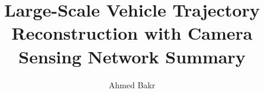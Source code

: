 \documentclass[conference]{IEEEtran}
\title{Large-Scale Vehicle Trajectory Reconstruction with Camera Sensing Network Summary}
\author[1]{Ahmed Bakr}
\affil[1]{Department of Computer Science, University of Alabama, AL, USA}
\begin{document}
\maketitle




\acresetall %





 






% 
\end{document}
